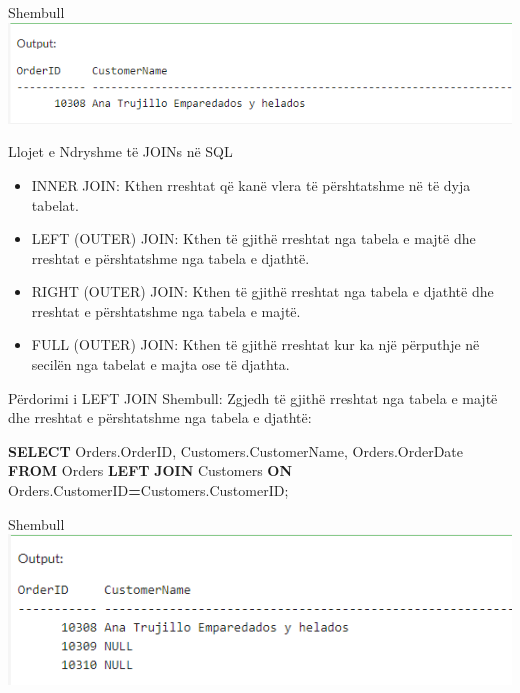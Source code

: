 \documentclass[
  ignorenonframetext,
]{beamer}
\newenvironment{Shaded}{\begin{snugshade}}{\end{snugshade}}
\newcommand{\KeywordTok}[1]{\textcolor[rgb]{0.13,0.29,0.53}{\textbf{#1}}}
\newcommand{\NormalTok}[1]{#1}
\newcommand{\OperatorTok}[1]{\textcolor[rgb]{0.81,0.36,0.00}{\textbf{#1}}}
\begin{document}
\begin{frame}{Shembull}
\label{shembull-29}
\includegraphics{./Figs/query84.png}
\end{frame}

\begin{frame}{Llojet e Ndryshme të JOINs në SQL}
\label{llojet-e-ndryshme-tuxeb-joins-nuxeb-sql}
\begin{itemize}
\item
  INNER JOIN: Kthen rreshtat që kanë vlera të përshtatshme në të dyja
  tabelat.
\item
  LEFT (OUTER) JOIN: Kthen të gjithë rreshtat nga tabela e majtë dhe
  rreshtat e përshtatshme nga tabela e djathtë.
\item
  RIGHT (OUTER) JOIN: Kthen të gjithë rreshtat nga tabela e djathtë dhe
  rreshtat e përshtatshme nga tabela e majtë.
\item
  FULL (OUTER) JOIN: Kthen të gjithë rreshtat kur ka një përputhje në
  secilën nga tabelat e majta ose të djathta.
\end{itemize}
\end{frame}

\begin{frame}[fragile]{Përdorimi i LEFT JOIN}
\label{puxebrdorimi-i-left-join}
Shembull: Zgjedh të gjithë rreshtat nga tabela e majtë dhe rreshtat e
përshtatshme nga tabela e djathtë:


\begin{Shaded}
\begin{Highlighting}[]
\KeywordTok{SELECT}\NormalTok{ Orders.OrderID, Customers.CustomerName, Orders.OrderDate}
\KeywordTok{FROM}\NormalTok{ Orders}
\KeywordTok{LEFT} \KeywordTok{JOIN}\NormalTok{ Customers }\KeywordTok{ON}\NormalTok{ Orders.CustomerID}\OperatorTok{=}\NormalTok{Customers.CustomerID;}
\end{Highlighting}
\end{Shaded}
\end{frame}

\begin{frame}{Shembull}
\label{shembull-30}
\includegraphics{./Figs/query85.png}
\end{frame}
\end{document}
